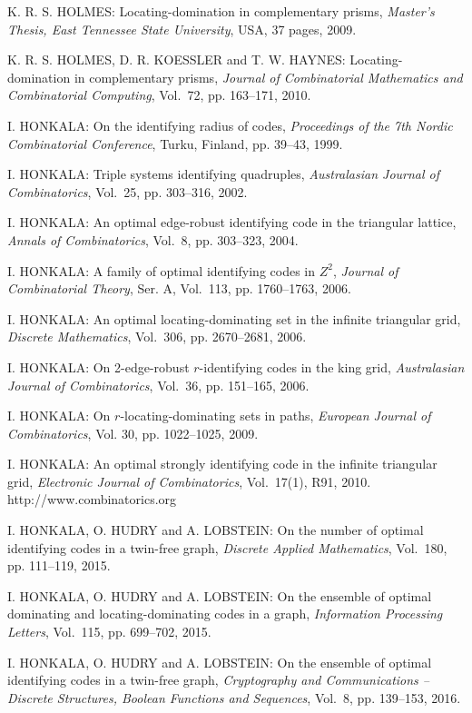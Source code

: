 \begin{thebibliography}{999}
K. R. S. HOLMES: Locating-domination in complementary prisms, {\it Master's Thesis, East Tennessee State University}, USA, 37 pages, 2009.

K. R. S. HOLMES, D. R. KOESSLER and T. W. HAYNES: Locating-domination in complementary prisms, {\it Journal of Combinatorial Mathematics and Combinatorial Computing}, Vol.~72, pp. 163--171, 2010.

I. HONKALA: On the identifying radius of codes, {\it Proceedings of the 7th Nordic Combinatorial Conference}, Turku, Finland, pp. 39--43, 1999.

I. HONKALA: Triple systems identifying quadruples, {\it Australasian Journal of Combinatorics}, Vol.~25, pp. 303--316, 2002.

I. HONKALA: An optimal edge-robust identifying code in the triangular lattice, {\it Annals of Combinatorics}, Vol.~8, pp. 303--323, 2004.

I. HONKALA: A family of optimal identifying codes in $Z^2$, {\it Journal of Combinatorial Theory}, Ser. A, Vol.~113, pp. 1760--1763, 2006.

I. HONKALA: An optimal locating-dominating set in the infinite triangular grid, {\it Discrete Mathematics}, Vol.~306, pp. 2670--2681, 2006.

I. HONKALA: On 2-edge-robust $r$-identifying codes in the king grid, {\it Australasian Journal of Combinatorics}, Vol.~36, pp. 151--165, 2006.

I. HONKALA: On $r$-locating-dominating sets in paths, {\it European Journal of Combinatorics}, Vol. 30, pp. 1022--1025, 2009.

I. HONKALA: An optimal strongly identifying code in the infinite triangular grid, {\it Electronic Journal of Combinatorics}, Vol.~17(1), R91, 2010.\\
http://www.combinatorics.org

 I. HONKALA, O. HUDRY and A. LOBSTEIN: On the number of optimal identifying codes in a twin-free graph, {\it Discrete Applied Mathematics}, Vol.~180, pp. 111--119, 2015.

 I. HONKALA, O. HUDRY and A. LOBSTEIN: On the ensemble of optimal dominating and locating-dominating codes in a graph, {\it Information Processing Letters}, Vol.~115, pp. 699--702, 2015.

 I. HONKALA, O. HUDRY and A. LOBSTEIN: On the ensemble of optimal identifying codes in a twin-free graph, {\it Cryptography and Communications -- Discrete Structures, Boolean Functions and Sequences}, Vol.~8, pp. 139--153, 2016.


\end{thebibliography}
